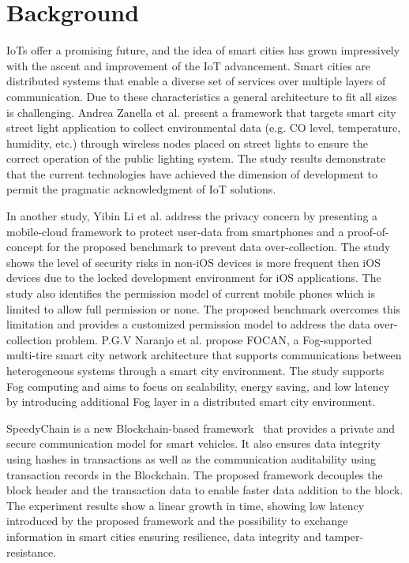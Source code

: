 \section{Background}
\label{sec:Background}
IoTs offer a promising future, and the idea of smart cities has grown impressively with the ascent and improvement of the IoT advancement. Smart cities are distributed systems that enable a diverse set of services over multiple layers of communication. Due to these characteristics a general architecture to fit all sizes is challenging. Andrea Zanella et al. \cite{zanella_internet_2014} present a framework that targets smart city street light application to collect environmental data (e.g. CO level, temperature, humidity, etc.) through wireless nodes placed on street lights to ensure the correct operation of the public lighting system. The study results demonstrate that the current technologies have achieved the dimension of development to permit the pragmatic acknowledgment of IoT solutions. 

In another study, Yibin Li et al. \cite{li_privacy_2016} address the privacy concern by presenting a mobile-cloud framework to protect user-data from smartphones and a proof-of-concept for the proposed benchmark to prevent data over-collection. The study shows the level of security risks in non-iOS devices is more frequent then iOS devices due to the locked development environment for iOS applications. The study also identifies the permission model of current mobile phones which is limited to allow full permission or none. The proposed benchmark overcomes this limitation and provides a customized permission model to address the data over-collection problem. P.G.V Naranjo et al. \cite{naranjo_focan:_2018} propose FOCAN, a Fog-supported multi-tire smart city network architecture that supports communications between heterogeneous systems through a smart city environment. The study supports Fog computing and aims to focus on scalability, energy saving, and low latency by introducing additional Fog layer in a distributed smart city environment. 

SpeedyChain is a new Blockchain-based framework~\cite{michelin_speedychain:_2018} that provides a private and secure communication model for smart vehicles. It also ensures data integrity using hashes in transactions as well as the communication auditability using transaction records in the Blockchain. The proposed framework decouples the block header and the transaction data to enable faster data addition to the block. The experiment results show a linear growth in time, showing low latency introduced by the proposed framework and the possibility to exchange information in smart cities ensuring resilience, data integrity and tamper-resistance.

